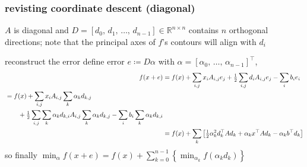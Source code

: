 \documentclass[10pt,dvipsnames*]{beamer}
\begin{document}
%
\begin{frame}
  \frametitle{revisting coordinate descent (diagonal)}
  \pause
  \begin{assumption*}
    $A$ is diagonal and $D = [d_0,\, d_1,\, \ldots,\, d_{n-1}] \in \mathbb{R}^{n \times n}$ contains $n$ orthogonal directions; note that the principal axes of $f$'s contours will align with $d_i$
  \end{assumption*}
  \pause
  \begin{alertblock}{reconstruct the error}
    define error $e \coloneqq D \alpha$ with $\alpha = [\alpha_0,\, \ldots,\, \alpha_{n-1}]^{\top}$,
    \begin{align}
      \hspace{-2\leftmargin}
      \label{eq:split-function-scalar}
      f(x + e) &= f(x) + \sum_{i,j} x_i A_{i,j} e_j + \tfrac 12 \sum_{i,j} d_i A_{i,j} e_j - \sum_i b_i e_i \\
      \begin{split}
        &= f(x) + \sum_{i,j} x_i A_{i,j} \sum_k \alpha_k d_{k,j} \\
        &\qquad + \tfrac 12 \sum_{i,j} \sum_k \alpha_k d_{k,i} A_{i,j}\sum_k \alpha_k d_{k,j} - \sum_i b_i \sum_k \alpha_k d_{k,i}
      \end{split}
      \\
      &= f(x) + \sum_k \left[ \tfrac 12 \alpha_k^2 d_k^{\top} A d_k + \alpha_k x^{\top} A d_k - \alpha_k b^{\top} d_k \right]
    \end{align}
    so finally $\min_{\alpha} f(x + e) = f(x) + \sum_{k=0}^{n-1} \left\{ \min_{\alpha_k} f(\alpha_k d_k) \right\}$
  \end{alertblock}
\end{frame}
%
\end{document}
